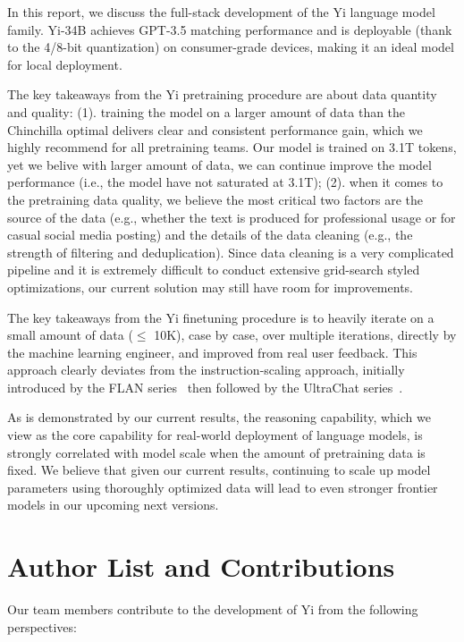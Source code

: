 \documentclass[numbers,sort&compress]{article}
\begin{document}
In this report, we discuss the full-stack development of the Yi language model family. 
Yi-34B achieves GPT-3.5 matching performance and is deployable (thank to the 4/8-bit quantization) on consumer-grade devices, making it an ideal model for local deployment. 

The key takeaways from the Yi pretraining procedure are about data quantity and quality: 
(1). training the model on a larger amount of data than the Chinchilla optimal delivers clear and consistent performance gain, which we highly recommend for all pretraining teams. 
Our model is trained on 3.1T tokens, yet we belive with larger amount of data, we can continue improve the model performance (i.e., the model have not saturated at 3.1T);
(2). when it comes to the pretraining data quality, we believe the most critical two factors are the source of the data (e.g., whether the text is produced for professional usage or for casual social media posting) and the details of the data cleaning (e.g., the strength of filtering and deduplication). Since data cleaning is a very complicated pipeline and it is extremely difficult to conduct extensive grid-search styled optimizations, our current solution may still have room for improvements. 

The key takeaways from the Yi finetuning procedure is to heavily iterate on a small amount of data ($\le$ 10K), case by case, over multiple iterations, directly by the machine learning engineer, and improved from real user feedback. 
This approach clearly deviates from the instruction-scaling approach, initially introduced by the FLAN series~\citep{chung2022scaling} then followed by the UltraChat series~\citep{ding2023enhancing}. 

As is demonstrated by our current results, the reasoning capability, which we view as the core capability for real-world deployment of language models, is strongly correlated with model scale when the amount of pretraining data is fixed. 
We believe that given our current
results, continuing to scale up model parameters using thoroughly optimized data
will lead to even stronger frontier models in our upcoming next versions.

\newpage
\appendix

\section{Author List and Contributions}

Our team members contribute to the development of Yi from the following perspectives: 
\end{document}

